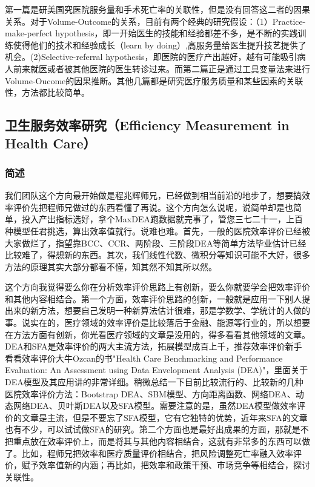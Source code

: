 \documentclass[11pt, a4paper]{article}
\begin{document}
第一篇是研美国究医院服务量和手术死亡率的关联性，但是没有回答这二者的因果关系。对于Volume-Outcome的关系，目前有两个经典的研究假设：（1）Practice-make-perfect hypothesis，即一开始医生的技能和经验都差不多，是不断的实践训练使得他们的技术和经验成长（learn by doing）,高服务量给医生提升技艺提供了机会。(2)Selective-referral hypothesis，即医院的医疗产出越好，越有可能吸引病人前来就医或者被其他医院的医生转诊过来。而第二篇正是通过工具变量法来进行Volume-Oucome的因果推断。其他几篇都是研究医疗服务质量和某些因素的关联性，方法都比较简单。


\subsection{卫生服务效率研究（Efficiency Measurement in Health Care）}

\subsubsection{简述}

我们团队这个方向最开始做是程兆辉师兄，已经做到相当前沿的地步了，想要搞效率评价先把程师兄做过的东西看懂了再说。这个方向怎么说呢，说简单却是也简单，投入产出指标选好，拿个MaxDEA跑数据就完事了，管您三七二十一，上百种模型任君挑选，算出效率值就行。说难也难。首先，一般的医院效率评价已经被大家做烂了，指望靠BCC、CCR、两阶段、三阶段DEA等简单方法毕业估计已经比较难了，得想新的东西。其次，我们线性代数、微积分等知识可能不大好，很多方法的原理其实大部分都看不懂，知其然不知其所以然。

这个方向我觉得要么你在分析效率评价思路上有创新，要么你就要学会把效率评价和其他内容相结合。第一个方面，效率评价思路的创新，一般就是应用一下别人提出来的新方法，想要自己发明一种新算法估计很难，那是学数学、学统计的人做的事。说实在的，医疗领域的效率评价是比较落后于金融、能源等行业的，所以想要在方法方面有创新，你光看医疗领域的文章是没用的，得多看看其他领域的文章。DEA和SFA是效率评价的两大主流方法，拓展模型成百上千，推荐效率评价新手看看效率评价大牛Ozcan的书"Health Care Benchmarking and Performance Evaluation: An Assessment using Data Envelopment Analysis (DEA)"，里面关于DEA模型及其应用讲的非常详细。稍微总结一下目前比较流行的、比较新的几种医院效率评价方法：Bootstrap DEA、SBM模型、方向距离函数、网络DEA、动态网络DEA、贝叶斯DEA以及SFA模型。需要注意的是，虽然DEA模型做效率评价的文章是主流，但是不要忘了SFA模型，它有它独特的优势，近年来SFA的文章也有不少，可以试试做SFA的研究。第二个方面也是最好出成果的方面，那就是不把重点放在效率评价上，而是将其与其他内容相结合，这就有非常多的东西可以做了。比如，程师兄把效率和医疗质量评价相结合，把风险调整死亡率融入效率评价，赋予效率值新的内涵；再比如，把效率和政策干预、市场竞争等相结合，探讨关联性。
\end{document}
